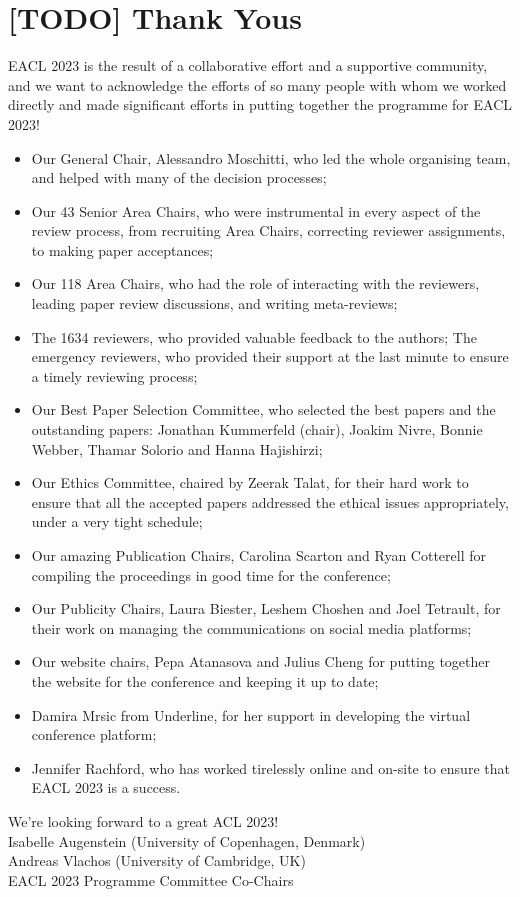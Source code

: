 \section*{[TODO] Thank Yous}
EACL 2023 is the result of a collaborative effort and a supportive community, and we want to acknowledge the efforts of so many people with whom we worked directly and made significant efforts in putting together the programme for EACL 2023! 
\begin{itemize}
\item Our General Chair, Alessandro Moschitti, who led the whole organising team, and helped with many of the decision processes;
\item Our 43 Senior Area Chairs, who were instrumental in every aspect of the review process, from recruiting Area Chairs, correcting reviewer assignments, to making paper acceptances;
\item Our 118 Area Chairs, who had the role of interacting with the reviewers, leading paper review discussions, and writing meta-reviews;
\item The 1634 reviewers, who provided valuable feedback to the authors;
The emergency reviewers, who provided their support at the last minute to ensure a timely reviewing process;
\item Our Best Paper Selection Committee, who selected the best papers and the outstanding papers: Jonathan Kummerfeld (chair), Joakim Nivre, Bonnie Webber, Thamar Solorio and Hanna Hajishirzi;
\item Our Ethics Committee, chaired by Zeerak Talat, for their hard work to ensure that all the accepted papers addressed the ethical issues appropriately, under a very tight schedule;
\item Our amazing Publication Chairs, Carolina Scarton and Ryan Cotterell for compiling the proceedings in good time for the conference;
\item Our Publicity Chairs, Laura Biester, Leshem Choshen and Joel Tetrault, for their work on managing the communications on social media platforms;
\item Our website chairs, Pepa Atanasova and Julius Cheng for putting together the website for the conference and keeping it up to date;
\item Damira Mrsic from Underline, for her support in developing the virtual conference platform;
\item Jennifer Rachford, who has worked tirelessly online and on-site to ensure that EACL 2023 is a success.
\end{itemize}


We’re looking forward to a great ACL 2023!\\

Isabelle Augenstein (University of Copenhagen, Denmark)\\
Andreas Vlachos (University of Cambridge, UK)\\
EACL 2023 Programme Committee Co-Chairs